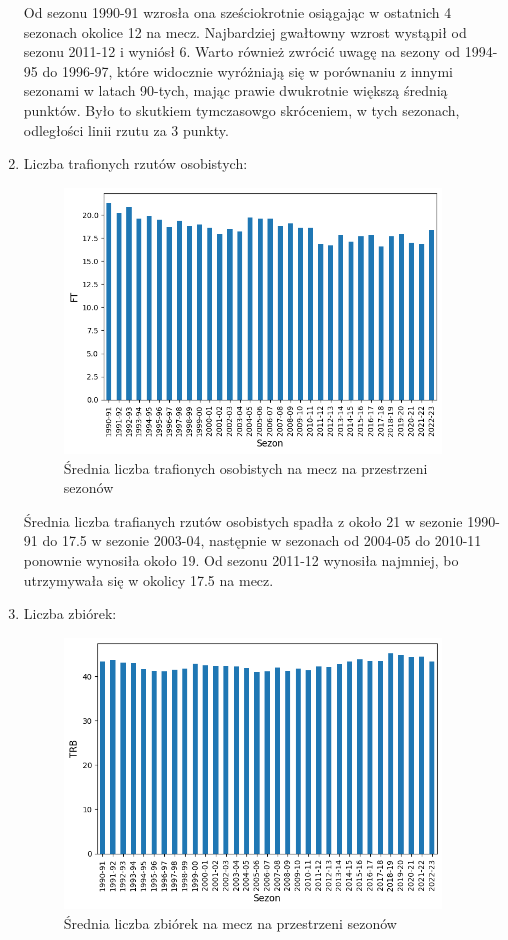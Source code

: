\documentclass{article}
\begin{document}
\begin{enumerate}
        Od sezonu 1990-91 wzrosła ona sześciokrotnie osiągając w ostatnich 4 sezonach okolice 12 na mecz. Najbardziej gwałtowny wzrost wystąpił od sezonu 2011-12 i wyniósł 6. Warto również zwrócić uwagę na sezony od 1994-95 do 1996-97, które widocznie wyróżniają się w porównaniu z innymi sezonami w latach 90-tych, mając prawie dwukrotnie większą średnią punktów. Było to skutkiem tymczasowgo skróceniem, w tych sezonach, odległości linii rzutu za 3 punkty.
 \newpage         
        \item Liczba trafionych rzutów osobistych:
            \begin{figure}[H]
                \centering
                \includegraphics[width=10cm]{wykres_FT.png}
                \caption{Średnia liczba trafionych osobistych na mecz na przestrzeni sezonów}
                \label{fig:wykres_FT}
            \end{figure}

        Średnia liczba trafianych rzutów osobistych spadła z około 21 w sezonie 1990-91 do 17.5 w sezonie 2003-04, następnie w sezonach od 2004-05 do 2010-11 ponownie wynosiła około 19. Od sezonu 2011-12 wynosiła najmniej, bo utrzymywała się w okolicy 17.5 na mecz.
 \newpage            
        \item Liczba zbiórek:
            \begin{figure}[H]
                \centering
                \includegraphics[width=10cm]{wykres_TRB.png}
                \caption{Średnia liczba zbiórek na mecz na przestrzeni sezonów}
                \label{fig:wykres_TRB}
            \end{figure}


\end{enumerate}
\end{document}
